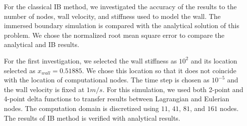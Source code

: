 For the classical IB method, we investigated the accuracy of the results to the number of nodes, wall velocity, and stiffness used to model the wall. The immersed boundary simulation is compared with the analytical solution of this problem. We chose the normalized root mean square error to compare the analytical and IB results.

For the first investigation, we selected the wall stiffness as $10^2$ and its location selected as $x_{wall} = 0.51885$. We chose this location so that it does not coincide with the location of computational nodes. The time step is chosen as $10^{-5}$ and the wall velocity is fixed at $1 m/s$. For this simulation, we used both 2-point and 4-point delta functions to transfer results between Lagrangian and Eulerian nodes. The computation domain is discretized using $11$, $41$, $81$, and $161$ nodes. The results of IB method is verified with analytical results.

